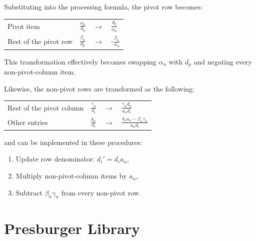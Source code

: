 \documentclass[logo,bsc,singlespacing,parskip]{infthesis}
\newenvironment{compactlist}
{ \begin{enumerate}
    \setlength{\itemsep}{0pt}
    \setlength{\parskip}{0pt}
    \setlength{\parsep}{0pt}     
}
{ \end{enumerate} }
\begin{document}
Substituting into the processing formula, the pivot row becomes:
\vspace*{-4mm}
\begin{table}[H]
\begin{center}
\begin{tabular}{llll}
Pivot item           & $\frac{\alpha_n}{d_p}$ & $\rightarrow$ & $\frac{d_p}{\alpha_n}$       \\
Rest of the pivot row    & $\frac{\beta_n}{d_p}$  & $\rightarrow$ & -$\frac{\beta_n}{\alpha_n}$  
\end{tabular}
\end{center}
\end{table}
\vspace*{-9mm}
This transformation effectively becomes swapping $\alpha_n$ with $d_p$ and
negating every non-pivot-column item. 

Likewise, the non-pivot rows are transformed as the following:
\vspace*{-4mm}
\begin{table}[H]
\begin{center}
\begin{tabular}{llll}
Rest of the pivot column& $\frac{\gamma_n}{d_i}$ & $\rightarrow$ & $\frac{\gamma_nd_p}{a_nd_i}$            \\
Other entries         & $\frac{\delta_n}{d_i}$    & $\rightarrow$ & $\frac{\delta_na_n-\beta_n\gamma_n}{a_nd_i}$  
\end{tabular}
\end{center}
\end{table}
\vspace*{-9mm}
and can be implemented in these procedures: 
\vspace*{-2.0mm}
\begin{compactlist}
    \item Update row denominator: $d_i' = d_ia_n$, 
    \item Multiply non-pivot-column items by $a_n$,
    \item Subtract $\beta_n\gamma_n$ from every non-pivot row.
\end{compactlist}

\section{Presburger Library}
\label{sec:presburger}
\end{document}
